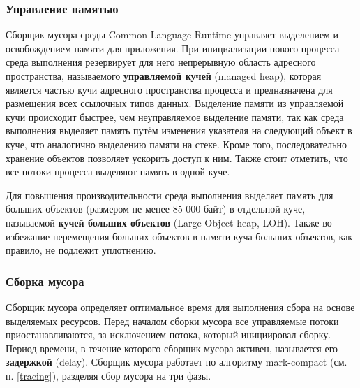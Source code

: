 \subsubsection{Управление памятью}

Сборщик мусора среды Common Language Runtime управляет выделением и освобождением памяти для приложения. При инициализации нового процесса среда выполнения резервирует для него непрерывную область адресного пространства, называемого \textbf{управляемой кучей} (managed heap), которая является частью кучи адресного пространства процесса и предназначена для размещения всех ссылочных типов данных. Выделение памяти из управляемой кучи происходит быстрее, чем неуправляемое выделение памяти, так как среда выполнения выделяет память путём изменения указателя на следующий объект в куче, что аналогично выделению памяти на стеке. Кроме того, последовательно хранение объектов позволяет ускорить доступ к ним. Также стоит отметить, что все потоки процесса выделяют память в одной куче.~\cite{dotnet_memory}

Для повышения производительности среда выполнения выделяет память для больших объектов (размером не менее 85 000 байт) в отдельной куче, называемой \textbf{кучей больших объектов} (Large Object heap, LOH). Также во избежание перемещения больших объектов в памяти куча больших объектов, как правило, не подлежит уплотнению.~\cite{dotnet_loh}



\subsubsection{Сборка мусора}

Сборщик мусора определяет оптимальное время для выполнения сбора на основе выделяемых ресурсов. Перед началом сборки мусора все управляемые потоки приостанавливаются, за исключением потока, который инициировал сборку. Период времени, в течение которого сборщик мусора активен, называется его \textbf{задержкой} (delay). Сборщик мусора работает по алгоритму mark-compact (см. п. \ref{tracing}), разделяя сбор мусора на три фазы.~\cite{dotnet_gc}

